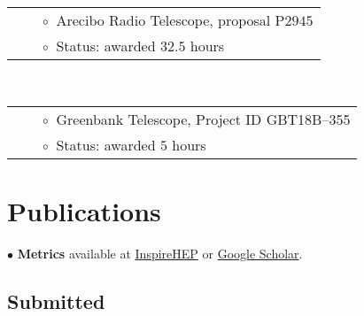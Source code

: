 \documentclass[11pt,letterpaper,sans,unicode]{moderncv}
\begin{document}
{
\begin{tabular}{rcl}
&\hspace{0.4cm} &{\color{color1} $\circ\;\;$}Arecibo Radio Telescope, proposal P$2945$ \\
&\hspace{0.4cm} &{\color{color1} $\circ\;\;$}Status: awarded $32.5$ hours
\end{tabular} \\

\begin{tabular}{rcl}
&\hspace{0.4cm} &{\color{color1} $\circ\;\;$}Greenbank Telescope, Project ID \textsc{GBT18B--355} \\
&\hspace{0.4cm} &{\color{color1} $\circ\;\;$}Status: awarded $5$ hours
\end{tabular}
}


\section{Publications}



$\bullet$ \textbf{Metrics} available at {\color{color1} \href{https://inspirehep.net/authors/1272186?ui-citation-summary=true}{InspireHEP} or \href{https://scholar.google.com/citations?user=CbNY_MYAAAAJ&hl=en}{Google Scholar}}.

\subsection{Submitted}
\end{document}
